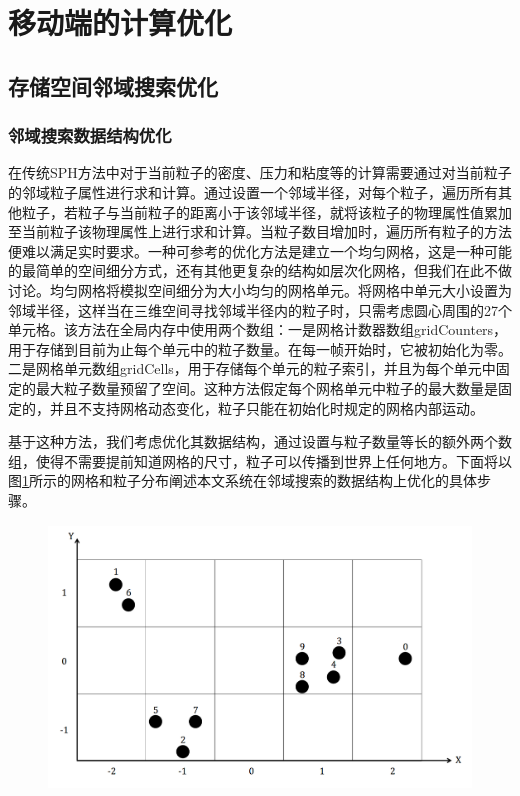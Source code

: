 \section{移动端的计算优化}
\subsection{存储空间邻域搜索优化}\label{optim}

\subsubsection{邻域搜索数据结构优化}
在传统SPH方法中对于当前粒子的密度、压力和粘度等的计算需要通过对当前粒子的邻域粒子属性进行求和计算。通过设置一个邻域半径，对每个粒子，遍历所有其他粒子，若粒子与当前粒子的距离小于该邻域半径，就将该粒子的物理属性值累加至当前粒子该物理属性上进行求和计算。当粒子数目增加时，遍历所有粒子的方法便难以满足实时要求。一种可参考的优化方法是建立一个均匀网格，这是一种可能的最简单的空间细分方式，还有其他更复杂的结构如层次化网格，但我们在此不做讨论。均匀网格将模拟空间细分为大小均匀的网格单元。将网格中单元大小设置为邻域半径，这样当在三维空间寻找邻域半径内的粒子时，只需考虑圆心周围的27个单元格。该方法在全局内存中使用两个数组：一是网格计数器数组gridCounters，用于存储到目前为止每个单元中的粒子数量。在每一帧开始时，它被初始化为零。二是网格单元数组gridCells，用于存储每个单元的粒子索引，并且为每个单元中固定的最大粒子数量预留了空间。这种方法假定每个网格单元中粒子的最大数量是固定的，并且不支持网格动态变化，粒子只能在初始化时规定的网格内部运动。

基于这种方法，我们考虑优化其数据结构，通过设置与粒子数量等长的额外两个数组，使得不需要提前知道网格的尺寸，粒子可以传播到世界上任何地方。下面将以图\ref{fig:gridParticle}所示的网格和粒子分布阐述本文系统在邻域搜索的数据结构上优化的具体步骤。

\begin{figure}[H]
    \centering
    \includegraphics[height=7cm]{image/gridParticle.png}
    \label{fig:gridParticle}
   \end{figure}


